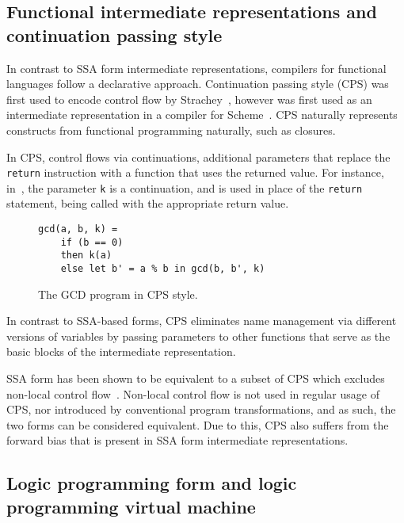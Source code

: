 \subsection{Functional intermediate representations and continuation passing style}

In contrast to SSA form intermediate representations, compilers for functional languages follow a declarative approach. Continuation passing style (CPS) was first used to encode control flow by Strachey~\cite{strachey2000continuations}, however was first used as an intermediate representation in a compiler for Scheme~\cite{steele1978rabbit}. CPS naturally represents constructs from functional programming naturally, such as closures.

In CPS, control flows via continuations, additional parameters that replace the \texttt{return} instruction with a function that uses the returned value. For instance, in~, the parameter \texttt{k} is a continuation, and is used in place of the \texttt{return} statement, being called with the appropriate return value.

\begin{figure}[ht]
  \centering
  \begin{varwidth}{\linewidth}
    \begin{verbatim}
gcd(a, b, k) = 
    if (b == 0) 
    then k(a) 
    else let b' = a % b in gcd(b, b', k)
\end{verbatim}
  \end{varwidth}
  \caption{The GCD program in CPS style.}
  \label{fig:gcd-cps}
\end{figure}

In contrast to SSA-based forms, CPS eliminates name management via different versions of variables by passing parameters to other functions that serve as the basic blocks of the intermediate representation. 

SSA form has been shown to be equivalent to a subset of CPS which excludes non-local control flow~\cite{kelsey1995correspondence, appel1998ssa}. Non-local control flow is not used in regular usage of CPS, nor introduced by conventional program transformations, and as such, the two forms can be considered equivalent. Due to this, CPS also suffers from the forward bias that is present in SSA form intermediate representations.

\subsection{Logic programming form and logic programming virtual machine}

